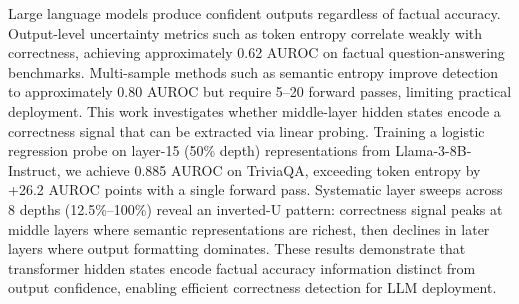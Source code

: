 
Large language models produce confident outputs regardless of factual accuracy. Output-level uncertainty metrics such as token entropy correlate weakly with correctness, achieving approximately 0.62 AUROC on factual question-answering benchmarks. Multi-sample methods such as semantic entropy improve detection to approximately 0.80 AUROC but require 5--20 forward passes, limiting practical deployment. This work investigates whether middle-layer hidden states encode a correctness signal that can be extracted via linear probing. Training a logistic regression probe on layer-15 (50\% depth) representations from Llama-3-8B-Instruct, we achieve 0.885 AUROC on TriviaQA, exceeding token entropy by +26.2 AUROC points with a single forward pass. Systematic layer sweeps across 8 depths (12.5\%--100\%) reveal an inverted-U pattern: correctness signal peaks at middle layers where semantic representations are richest, then declines in later layers where output formatting dominates. These results demonstrate that transformer hidden states encode factual accuracy information distinct from output confidence, enabling efficient correctness detection for LLM deployment.

